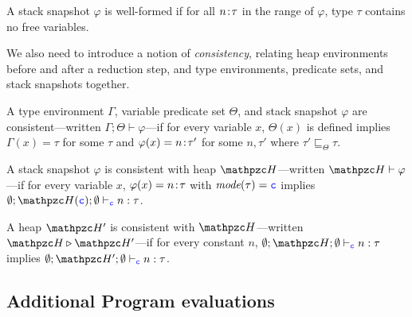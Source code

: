 \begin{defi}
A stack snapshot $\varphi$ is well-formed if
for all ${n}\!:\!{\tau}$ in the range of $\varphi$, type $\tau$
contains no free variables. 
\end{defi}

We also need to introduce a notion of
\emph{consistency}, relating heap environments before and after a
reduction step, and type environments, predicate sets, and stack
snapshots together.


\begin{defi}
A type environment $\Gamma$, variable predicate set $\Theta$, and
stack snapshot $\varphi$ are consistent---written $\Gamma;\Theta\vdash
\varphi$---if for every variable $x$, $\Theta(x)$ is defined implies
$\Gamma(x) = \tau$ for some $\tau$ and 
$\varphi(x) ={n}\!:\!{\tau'}$ for some $n,\tau'$ where $\tau' \sqsubseteq_{\Theta} \tau$. 
\end{defi}

\begin{defi}
A stack snapshot $\varphi$ is consistent with heap $\heap$---written $\heap \vdash \varphi$---if
for every variable $x$, $\varphi(x)= {n}\!:\!{\tau}$ with $\textit{mode}(\tau)=\textcolor{blue}{\texttt{c}}$ implies $\emptyset;\heap(\cmode);\emptyset \vdash_{\cmode} n:\tau$.
\end{defi}

\begin{defi}
A heap $\heap'$ is consistent with $\heap$---written $\heap \triangleright \heap'$---if
for every constant $n$, $\emptyset;\heap;\emptyset \vdash_{\cmode} n:\tau$ implies $\emptyset;\heap';\emptyset \vdash_{\cmode} n:\tau$.
\end{defi}

\subsection{Additional Program evaluations}\label{appx:add-prog-eval}

